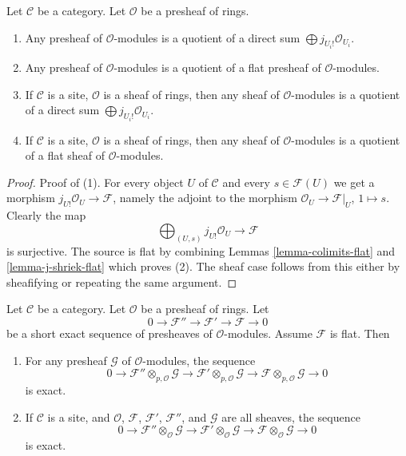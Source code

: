 \begin{lemma}
\label{lemma-module-quotient-flat}
Let $\mathcal{C}$ be a category.
Let $\mathcal{O}$ be a presheaf of rings.
\begin{enumerate}
\item Any presheaf of $\mathcal{O}$-modules is a quotient of
a direct sum $\bigoplus j_{U_i!}\mathcal{O}_{U_i}$.
\item Any presheaf of $\mathcal{O}$-modules is a quotient of
a flat presheaf of $\mathcal{O}$-modules.
\item If $\mathcal{C}$ is a site, $\mathcal{O}$ is a sheaf of rings,
then any sheaf of $\mathcal{O}$-modules is a quotient of
a direct sum $\bigoplus j_{U_i!}\mathcal{O}_{U_i}$.
\item If $\mathcal{C}$ is a site, $\mathcal{O}$ is a sheaf of rings,
then any sheaf of $\mathcal{O}$-modules is a quotient of
a flat sheaf of $\mathcal{O}$-modules.
\end{enumerate}
\end{lemma}

\begin{proof}
Proof of (1). For every object $U$ of $\mathcal{C}$ and every
$s \in \mathcal{F}(U)$ we get a morphism
$j_{U!}\mathcal{O}_U \to \mathcal{F}$, namely the adjoint to
the morphism $\mathcal{O}_U \to \mathcal{F}|_U$, $1 \mapsto s$.
Clearly the map
$$
\bigoplus\nolimits_{(U, s)} j_{U!}\mathcal{O}_U
\longrightarrow
\mathcal{F}
$$
is surjective. The source is flat by combining Lemmas
\ref{lemma-colimits-flat} and \ref{lemma-j-shriek-flat}
which proves (2). The sheaf case follows from this either by
sheafifying or repeating the same argument.
\end{proof}

\begin{lemma}
\label{lemma-flat-tor-zero}
Let $\mathcal{C}$ be a category.
Let $\mathcal{O}$ be a presheaf of rings.
Let
$$
0 \to \mathcal{F}'' \to \mathcal{F}' \to \mathcal{F} \to 0
$$
be a short exact sequence of presheaves of $\mathcal{O}$-modules.
Assume $\mathcal{F}$ is flat. Then
\begin{enumerate}
\item For any presheaf $\mathcal{G}$
of $\mathcal{O}$-modules, the sequence
$$
0 \to
\mathcal{F}'' \otimes_{p, \mathcal{O}} \mathcal{G} \to
\mathcal{F}' \otimes_{p, \mathcal{O}} \mathcal{G} \to
\mathcal{F} \otimes_{p, \mathcal{O}} \mathcal{G} \to 0
$$
is exact.
\item If $\mathcal{C}$ is a site, and $\mathcal{O}$,
$\mathcal{F}$, $\mathcal{F}'$, $\mathcal{F}''$, and
$\mathcal{G}$ are all sheaves, the sequence
$$
0 \to
\mathcal{F}'' \otimes_\mathcal{O} \mathcal{G} \to
\mathcal{F}' \otimes_\mathcal{O} \mathcal{G} \to
\mathcal{F} \otimes_\mathcal{O} \mathcal{G} \to 0
$$
is exact.
\end{enumerate}
\end{lemma}

